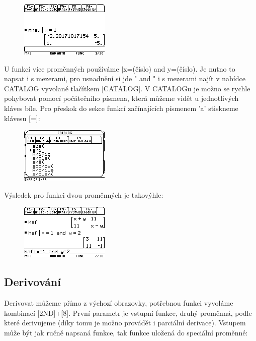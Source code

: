 \documentclass[10pt,a4paper,float]{article}
\begin{document}
\begin{figure}[H]
	\centering
	\includegraphics[width=.5\textwidth]{img/UZITIMATIC2}
\end{figure}

\pagebreak

U funkcí více proměnných používáme $\vert$x=(číslo) and y=(číslo). Je nutno to napsat i s mezerami, pro usnadnění si jde " and " i s mezerami najít v nabídce CATALOG vyvolané tlačítkem [CATALOG]. V CATALOGu je možno se rychle pohybovat pomocí počátečního písmena, která můžeme vidět u jednotlivých kláves bíle. Pro přeskok do sekce funkcí začínajících písmenem 'a' stiskneme klávesu [=]:

\begin{figure}[H]
	\centering
	\includegraphics[width=.5\textwidth]{img/CATALOG}
\end{figure}

Výsledek pro funkci dvou proměnných je takovýhle:

\begin{figure}[H]
	\centering
	\includegraphics[width=.5\textwidth]{img/UZITIMATIC3}
\end{figure}

\subsection{Derivování}
Derivovat můžeme přímo z výchozí obrazovky, potřebnou funkci vyvoláme kombinací [2ND]+[8]. První parametr je vstupní funkce, druhý proměnná, podle které derivujeme (díky tomu je možno provádět i parciální derivace). Vstupem může být jak ručně napsaná funkce, tak funkce uložená do speciální proměnné:
\end{document}
